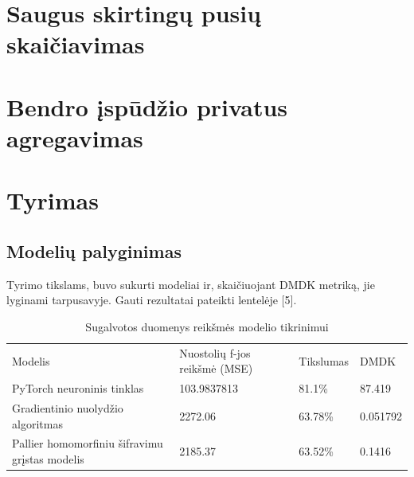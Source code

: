 \documentclass{VUMIFInfBakalaurinis}
\begin{document}
\section{Saugus skirtingų pusių skaičiavimas}

\section{Bendro įspūdžio privatus agregavimas}

\section{Tyrimas}
\subsection{Modelių palyginimas}

\par Tyrimo tikslams, buvo sukurti modeliai ir, skaičiuojant DMDK metriką, jie lyginami tarpusavyje. Gauti rezultatai pateikti lentelėje [5].

\begin{table}[h]
\begin{adjustbox}{width=\textwidth,center=\textwidth}
\begin{tabular}{|l|l|l|l|}
\cline{1-4}
Modelis & Nuostolių f-jos reikšmė (MSE) & Tikslumas & DMDK  \\\cline{1-4}
PyTorch neuroninis tinklas & 103.9837813 & 81.1\% & 87.419  \\\cline{1-4}
Gradientinio nuolydžio algoritmas & 2272.06 & 63.78\% & 0.051792 \\\cline{1-4}
Pallier homomorfiniu šifravimu grįstas modelis & 2185.37 & 63.52\% & 0.1416 \\\cline{1-4}
\end{tabular}
\end{adjustbox}
\caption{Sugalvotos duomenys reikšmės modelio tikrinimui}
\label{tab:my-table}
\end{table}
\end{document}
